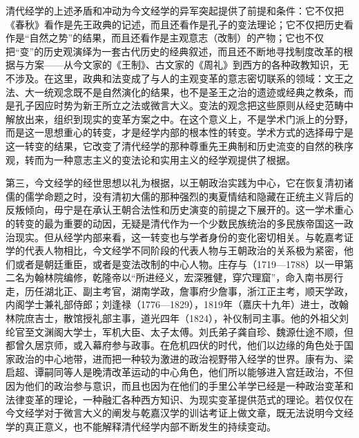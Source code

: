 \documentclass[a4paper, 12pt, openright]{ctexbook}
\begin{document}
清代经学的上述矛盾和冲动为今文经学的异军突起提供了前提和条件：它不仅把《春秋》看作是先王政典的记述，而且还看作是孔子的变法理论；它不仅把历史看作是“自然之势”的结果，而且还看作是主观意志（改制）的产物；它也不仅把“变”的历史观演绎为一套古代历史的经典叙述，而且还不断地寻找制度改革的根据与方案——从今文家的《王制》、古文家的《周礼》到西方的各种政教知识，无不涉及。在这里，政典和法变成了与人的主观变革的意志密切联系的领域：文王之法、大一统观念既不是自然演化的结果，也不是圣王之治的遗迹或经典之教条，而是孔子因应时势为新王所立之法或微言大义。变法的观念把这些原则从经史范畴中解放出来，组织到现实的变革方案之中。在这个意义上，不是学术门派上的分野，而是这一思想重心的转变，才是经学内部的根本性的转变。学术方式的选择毋宁是这一转变的结果，它改变了清代经学的那种尊重先王典制和历史流变的自然的秩序观，转而为一种意志主义的变法论和实用主义的经学观提供了根据。

第三，今文经学的经世思想以礼为根据，以王朝政治实践为中心，它在恢复清初诸儒的儒学命题之时，没有清初大儒的那种强烈的夷夏情结和隐藏在正统主义背后的反叛倾向，毋宁是在承认王朝合法性和历史演变的前提之下展开的。这一学术重心的转变的最为重要的动因，无疑是清代作为一个少数民族统治的多民族帝国这一政治现实。但从经学内部来看，这一转变也与学者身份的变化密切相关。与乾嘉考证学的代表人物相比，今文经学不同阶段的代表人物与王朝政治的关系极为紧密，他们或者是朝廷重臣，或者是变法改制的中心人物。庄存与（1719—1788）以一甲第二名为翰林院编修，乾隆帝以“所进经义，宏深雅健，穿穴理窟”，命入南书房行走，历任湖北正、副主考官，湖南学政，詹事府少詹事，浙江正主考，顺天学政，内阁学士兼礼部侍郎；刘逢禄（1776—1829），1819年（嘉庆十九年）进士，改翰林院庶吉士，散馆授礼部主事，道光四年（1824），补仪制司主事。他的外祖父刘纶官至文渊阁大学士，军机大臣、太子太傅。刘氏弟子龚自珍、魏源仕途不顺，但都曾久居京师，或入幕府参与政事。在危机四伏的时代，他们以边缘的角色处于国家政治的中心地带，进而把一种较为激进的政治视野带入经学的世界。康有为、梁启超、谭嗣同等人是晚清改革运动的中心角色，他们所以能够进入宫廷政治，不但因为他们的政治参与意识，而且也因为在他们的手里公羊学已经是一种政治变革和法律变革的理论，一种融汇各种西方知识、为现实变革提供范式的理论。若仅仅在今文经学对于微言大义的阐发与乾嘉汉学的训诂考证上做文章，既无法说明今文经学的真正意义，也不能解释清代经学内部不断发生的持续变动。
\end{document}
